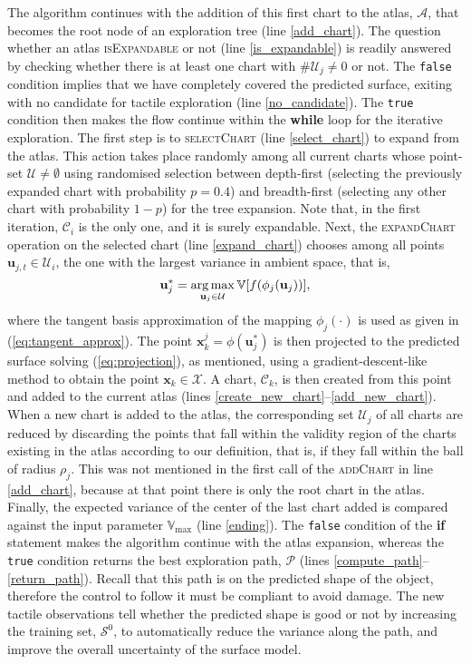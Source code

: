 The algorithm continues with the addition of this first chart to the atlas, $\mathcal{A}$, that becomes the root node of an exploration tree (line \ref{add_chart}). The question whether an atlas \textsc{isExpandable} or not (line \ref{is_expandable}) is readily answered by checking whether there is at least one chart with $\#\mathcal{U}_j \neq 0$ or not. The \texttt{false} condition implies that we have completely covered the predicted surface, exiting with no candidate for tactile exploration (line \ref{no_candidate}). The \texttt{true} condition then makes the flow continue within the \textbf{while} loop for the iterative exploration. The first step is to \textsc{selectChart} (line \ref{select_chart}) to expand from the atlas. This action takes place randomly among all current charts whose point-set $\mathcal{U} \neq \emptyset$ using randomised selection between depth-first (selecting the previously expanded chart with probability $p = 0.4$) and breadth-first (selecting any other chart with probability $1-p$) for the tree expansion. Note that, in the first iteration, $\mathcal{C}_i$ is the only one, and it is surely expandable. Next, the \textsc{expandChart} operation on the selected chart (line \ref{expand_chart}) chooses among all points $\mathbf{u}_{j,t} \in \mathcal{U}_i$, the one with the largest variance in ambient space, that is,
\begin{equation}
\mathbf{u}_{j}^* =  \operatorname*{arg\,max}_{\mathbf{u}_{j} \in \mathcal{U}} \mathbb{V}[f(\phi_j(\mathbf{u}_{j}))], 
\end{equation}
where the tangent basis approximation of the mapping $\phi_j(\cdot)$ is used as given in (\ref{eq:tangent_approx}). The point $\mathbf{x}_k^j = \phi(\mathbf{u}_{j}^*)$ is then projected to the predicted surface solving (\ref{eq:projection}), as mentioned, using a gradient-descent-like method to obtain the point $\mathbf{x}_k \in \mathcal{X}$. A chart, $\mathcal{C}_k$, is then created from this point and added to the current atlas (lines \ref{create_new_chart}--\ref{add_new_chart}). When a new chart is added to the atlas, the corresponding set $\mathcal{U}_j$ of all charts are reduced by discarding the points that fall within the validity region of the charts existing in the atlas according to our definition, that is, if they fall within the ball of radius $\rho_j$. This was not mentioned in the first call of the \textsc{addChart} in line \ref{add_chart}, because at that point there is only the root chart in the atlas. Finally, the expected variance of the center of the last chart added is compared against the input parameter $\mathbb{V}_{\max}$ (line \ref{ending}). The \texttt{false} condition of the \textbf{if} statement makes the algorithm continue with the atlas expansion, whereas the \texttt{true} condition returns the best exploration path, $\mathcal{P}$ (lines \ref{compute_path}--\ref{return_path}). Recall that this path is on the predicted shape of the object, therefore the control to follow it must be compliant to avoid damage. The new tactile observations tell whether the predicted shape is good or not by increasing the training set, $\mathcal{S}^0$, to automatically reduce the variance along the path, and improve the overall uncertainty of the surface model.

